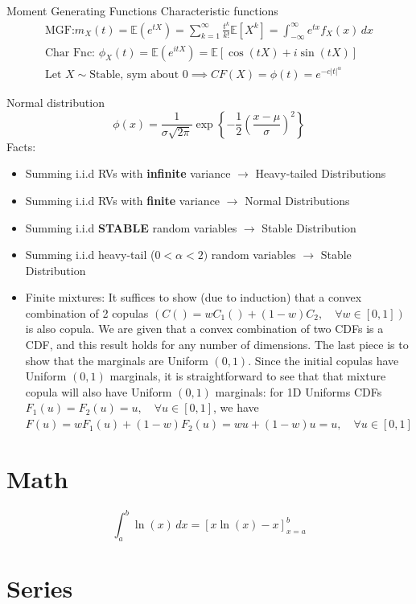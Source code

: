 \documentclass[
  oneside]{book}
\begin{document}
Moment Generating Functions Characteristic functions
\[
\begin{gathered}
\text{MGF:} m_{X}(t) = \mathbb{E}(e^{tX})=\sum^{\infty}_{k=1} \frac{t^{k}}{k!}\mathbb{E}[X^{k}] = \int_{-\infty}^{\infty} e^{tx}f_{X}(x) \, dx \\
\text{Char Fnc: } \phi_{X}(t) =\mathbb{E}(e^{itX}) = \mathbb{E}[\cos (tX)+i\sin(tX)]\\
\text{Let } X \sim \text{Stable, sym about 0} \implies CF(X) = \phi(t) = e^{-c|t|^{\alpha}}  
\end{gathered}
\]

Normal distribution
\[
\phi(x) = \frac{1}{\sigma\sqrt{ 2\pi }}\exp \left\{ -\frac{1}{2}\left( \frac{x-\mu}{\sigma} \right)^{2} \right\} 
\]
Facts:

\begin{itemize}
\item
  Summing i.i.d RVs with \textbf{infinite} variance \(\to\) Heavy-tailed Distributions
\item
  Summing i.i.d RVs with \textbf{finite} variance \(\to\) Normal Distributions
\item
  Summing i.i.d \textbf{STABLE} random variables \(\to\) Stable Distribution
\item
  Summing i.i.d heavy-tail (\(0<\alpha < 2)\) random variables \(\to\) Stable Distribution
\item
  Finite mixtures: It suffices to show (due to induction) that a convex combination of 2 copulas \(\left(C()=w C_1()+(1-w) C_2, \quad \forall w \in[0,1]\right)\) is also copula. We are given that a convex combination of two CDFs is a CDF, and this result holds for any number of dimensions. The last piece is to show that the marginals are Uniform \((0,1)\). Since the initial copulas have Uniform \((0,1)\) marginals, it is straightforward to see that that mixture copula will also have Uniform \((0,1)\) marginals: for 1D Uniforms CDFs \(F_1(u)=F_2(u)=u, \quad \forall u \in[0,1]\), we have \(F(u)=w F_1(u)+(1-w) F_2(u)=w u+(1-w) u=u, \quad \forall u \in[0,1]\)
\end{itemize}

\hypertarget{math}{%
\section{Math}\label{math}}

\[
\int_{a}^{b} \ln(x) \, dx = \left[ x\ln(x) - x\right] ^{b}_{x=a}
\]

\hypertarget{series}{%
\section{Series}\label{series}}
\end{document}
